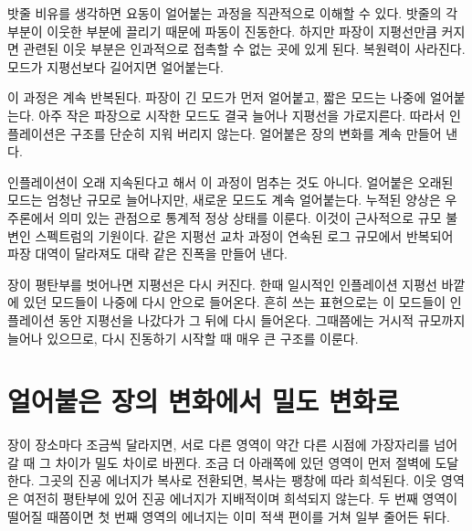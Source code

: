 밧줄 비유를 생각하면 요동이 얼어붙는 과정을 직관적으로 이해할 수 있다. 밧줄의 각 부분이 이웃한 부분에 끌리기 때문에 파동이 진동한다. 하지만 파장이 지평선만큼 커지면 관련된 이웃 부분은 인과적으로 접촉할 수 없는 곳에 있게 된다. 복원력이 사라진다. 모드가 지평선보다 길어지면 얼어붙는다.

이 과정은 계속 반복된다. 파장이 긴 모드가 먼저 얼어붙고, 짧은 모드는 나중에 얼어붙는다. 아주 작은 파장으로 시작한 모드도 결국 늘어나 지평선을 가로지른다. 따라서 인플레이션은 구조를 단순히 지워 버리지 않는다. 얼어붙은 장의 변화를 계속 만들어 낸다.

인플레이션이 오래 지속된다고 해서 이 과정이 멈추는 것도 아니다. 얼어붙은 오래된 모드는 엄청난 규모로 늘어나지만, 새로운 모드도 계속 얼어붙는다. 누적된 양상은 우주론에서 의미 있는 관점으로 통계적 정상 상태를 이룬다. 이것이 근사적으로 규모 불변인 스펙트럼의 기원이다. 같은 지평선 교차 과정이 연속된 로그 규모에서 반복되어 파장 대역이 달라져도 대략 같은 진폭을 만들어 낸다.

장이 평탄부를 벗어나면 지평선은 다시 커진다. 한때 일시적인 인플레이션 지평선 바깥에 있던 모드들이 나중에 다시 안으로 들어온다. 흔히 쓰는 표현으로는 이 모드들이 인플레이션 동안 지평선을 나갔다가 그 뒤에 다시 들어온다. 그때쯤에는 거시적 규모까지 늘어나 있으므로, 다시 진동하기 시작할 때 매우 큰 구조를 이룬다.

\begin{classroomqa}
\end{classroomqa}

\begin{classroomqa}
\end{classroomqa}

\section{얼어붙은 장의 변화에서 밀도 변화로}

장이 장소마다 조금씩 달라지면, 서로 다른 영역이 약간 다른 시점에 가장자리를 넘어갈 때 그 차이가 밀도 차이로 바뀐다. 조금 더 아래쪽에 있던 영역이 먼저 절벽에 도달한다. 그곳의 진공 에너지가 복사로 전환되면, 복사는 팽창에 따라 희석된다. 이웃 영역은 여전히 평탄부에 있어 진공 에너지가 지배적이며 희석되지 않는다. 두 번째 영역이 떨어질 때쯤이면 첫 번째 영역의 에너지는 이미 적색 편이를 거쳐 일부 줄어든 뒤다.

